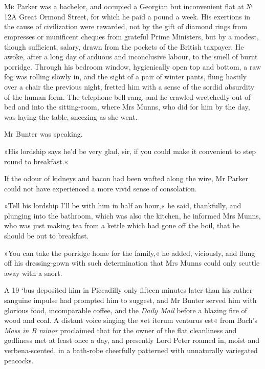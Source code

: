 \chapter[Chapter \thechapter]{}
\lettrine[lines=4]{M}{r} Parker was a bachelor, and occupied a Georgian but inconvenient flat at № 12A Great Ormond Street, for which he paid a pound a week. His exertions in the cause of civilization were rewarded, not by the gift of diamond rings from empresses or munificent cheques from grateful Prime Ministers, but by a modest, though sufficient, salary, drawn from the pockets of the British taxpayer. He awoke, after a long day of arduous and inconclusive labour, to the smell of burnt porridge. Through his bedroom window, hygienically open top and bottom, a raw fog was rolling slowly in, and the sight of a pair of winter pants, flung hastily over a chair the previous night, fretted him with a sense of the sordid absurdity of the human form. The telephone bell rang, and he crawled wretchedly out of bed and into the sitting-room, where Mrs Munns, who did for him by the day, was laying the table, sneezing as she went.

Mr Bunter was speaking.

»His lordship says he'd be very glad, sir, if you could make it convenient to step round to breakfast.«

If the odour of kidneys and bacon had been wafted along the wire, Mr Parker could not have experienced a more vivid sense of consolation.

»Tell his lordship I'll be with him in half an hour,« he said, thankfully, and plunging into the bathroom, which was also the kitchen, he informed Mrs Munns, who was just making tea from a kettle which had gone off the boil, that he should be out to breakfast.

»You can take the porridge home for the family,« he added, viciously, and flung off his dressing-gown with such determination that Mrs Munns could only scuttle away with a snort.

A 19 `bus deposited him in Piccadilly only fifteen minutes later than his rather sanguine impulse had prompted him to suggest, and Mr Bunter served him with glorious food, incomparable coffee, and the \textit{Daily Mail} before a blazing fire of wood and coal. A distant voice singing the »et iterum venturus est« from Bach's \textit{Mass in B minor} proclaimed that for the owner of the flat cleanliness and godliness met at least once a day, and presently Lord Peter roamed in, moist and verbena-scented, in a bath-robe cheerfully patterned with unnaturally variegated peacocks.

